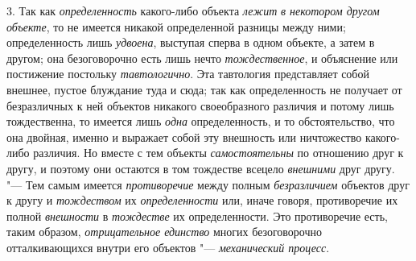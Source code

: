 3. Так как {\em определенность} какого-либо объекта {\em лежит}
{\em в некотором другом объекте},
то не имеется никакой определенной разницы между ними;
определенность лишь {\em удвоена},
выступая сперва в одном объекте, а затем в другом; она
безоговорочно есть лишь нечто {\em тождественное}, и
объяснение или постижение постольку {\em тавтологично}. Эта
тавтология представляет собой внешнее, пустое блуждание туда и сюда; так
как определенность не получает от безразличных к ней объектов никакого
своеобразного различия и потому лишь тождественна, то имеется лишь {\em одна}
определенность, и то обстоятельство, что она двойная, именно
и выражает собой эту внешность или ничтожество какого-либо различия. Но
вместе с тем объекты {\em самостоятельны} по
отношению друг к другу, и поэтому они остаются в том тождестве всецело
{\em внешними} друг другу. "--- Тем самым имеется {\em противоречие} между
полным {\em безразличием} объектов друг к другу и {\em тождеством} их
{\em определенности} или, иначе говоря, противоречие их полной
{\em внешности} в {\em тождестве} их определенности. Это противоречие есть,
таким образом, {\em отрицательное единство} многих безоговорочно
отталкивающихся внутри его объектов "--- {\em механический процесс}.

